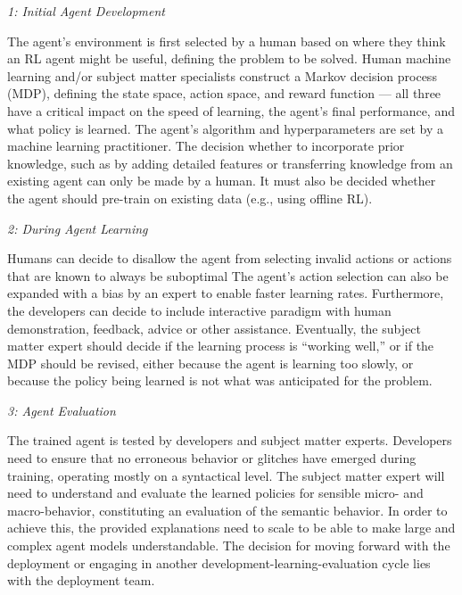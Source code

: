 \documentclass[twoside,11pt]{article}
\begin{document}
\vspace{2mm}
\emph{1: Initial Agent Development}

The agent's environment is first selected by a human based on where they think an RL agent might be useful, defining the problem to be solved.
Human machine learning and/or subject matter specialists construct a Markov decision process (MDP), defining the state space, action space, and reward function --- all three have a critical impact on the speed of learning, the agent's final performance, and what policy is learned. 
The agent's algorithm and hyperparameters are set by a machine learning practitioner. 
The decision whether to incorporate prior knowledge, such as by adding detailed features or transferring knowledge from an existing agent can only be made by a human. 
It must also be decided whether the agent should pre-train on existing data (e.g., using offline RL).
\vspace{2mm}

\emph{2: During Agent Learning}

Humans can decide to disallow the agent from selecting invalid actions or actions that are known to always be suboptimal
The agent's action selection can also be expanded with a bias by an expert to  enable faster learning rates.
Furthermore, the developers can decide to include interactive paradigm with human demonstration, feedback, advice or other assistance.
Eventually, the subject matter expert should decide if the learning process is ``working well,'' or if the MDP should be revised, either because the agent is learning too slowly, or because the policy being learned is not what was anticipated for the problem.
\vspace{2mm}

\emph{3: Agent Evaluation}

The trained agent is tested by developers and subject matter experts.
Developers need to ensure that no erroneous behavior or glitches have emerged during training, operating mostly on a syntactical level.
The subject matter expert will need to understand and evaluate the learned policies for sensible micro- and macro-behavior, constituting an evaluation of the semantic behavior.
In order to achieve this, the provided explanations need to scale to be able to make large and complex agent models understandable.
The decision for moving forward with the deployment or engaging in another development-learning-evaluation cycle lies with the deployment team.
\vspace{2mm}
\end{document}
